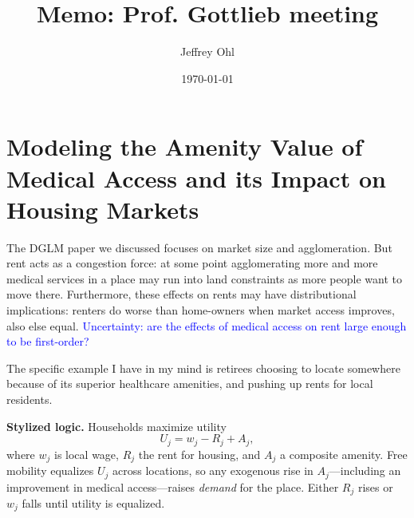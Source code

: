 \documentclass[11pt]{article}
\title{Memo: Prof. Gottlieb meeting}
\author{Jeffrey Ohl}
\date{\today}
\begin{document}
\maketitle

\section{Modeling the Amenity Value of Medical Access and its Impact on  Housing Markets}

 The DGLM paper we discussed focuses on market size and agglomeration. But rent acts as a congestion force: at some point agglomerating more and more medical services in a place may run into land constraints as more people want to move there.  Furthermore, these effects on rents may have distributional implications: renters do worse than home-owners when market access improves, also else equal.
\textcolor{blue}{Uncertainty: are the effects of medical access on rent large enough to be first-order? }%

The specific example I have in my mind is retirees choosing to locate somewhere because of its superior healthcare amenities, and pushing up rents for local residents. 




\textbf{Stylized logic.}  Households maximize utility
\[
U_{j}=w_{j}-R_{j}+A_{j},
\]
where $w_{j}$ is local wage, $R_{j}$ the rent for housing, and $A_{j}$ a composite amenity.  
Free mobility equalizes $U_{j}$ across locations, so any exogenous rise in $A_{j}$—including an improvement in medical access—raises \emph{demand} for the place. Either $R_{j}$ rises or $w_{j}$ falls until utility is equalized.

\medskip\noindent
\end{document}

